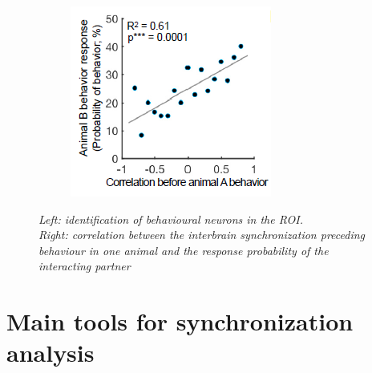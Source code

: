 \documentclass[a4paper]{article}
\begin{document}
\begin{figure}[H]
\begin{minipage}{\linewidth}
\begin{minipage}{0.4\linewidth}
\begin{figure}[H]
			\end{figure}
		\end{minipage}
		\hspace{0.05\linewidth}
		\begin{minipage}{0.5\linewidth}
			\begin{figure}[H]
				\includegraphics[width=\linewidth]{kingsbury3.png}
				
			\end{figure}
		\end{minipage}
		
	\end{minipage}
	\caption{\textit{Left: identification of behavioural neurons in the ROI. \\
			Right: correlation between the interbrain synchronization preceding behaviour in one animal and the response probability of the interacting partner}}
\end{figure}

\newpage


\section{Main tools for synchronization analysis}
\end{document}
